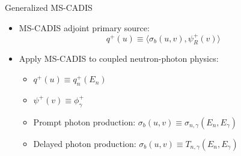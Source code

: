 \documentclass{beamer}
\begin{document}
\begin{frame}{Generalized MS-CADIS}
\begin{itemize}
\item{MS-CADIS adjoint primary source:}
\begin{equation}
  q^{+}(u) \equiv \langle \sigma_b(u,v) , \psi_R^{+}(v) \rangle
\end{equation}
\item{Apply MS-CADIS to coupled neutron-photon physics:}
	\begin{itemize}
		\item{$q^+(u) \equiv q_n^+(E_n)$}
			\vspace{0.1cm}
		\item{$\psi^+(v) \equiv \phi_{\gamma}^+$}
			\vspace{0.1cm}
	\item{Prompt photon production: $\sigma_b(u,v) \equiv \sigma_{n,\gamma}(E_n,
	E_{\gamma})$}
			\vspace{0.1cm}
	\item{Delayed photon production: $\sigma_b(u,v) \equiv 
	T_{n,\gamma}(E_n,E_{\gamma})$}
	\end{itemize}

\end{itemize}
\end{frame}

%
		
\end{document}
